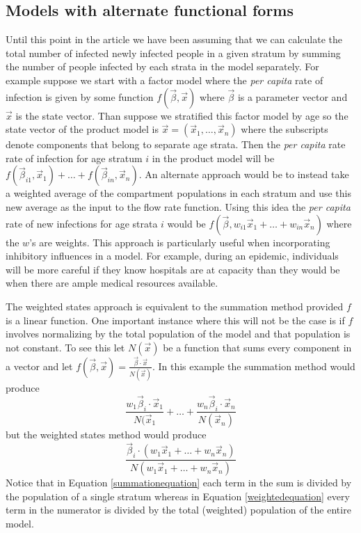 \documentclass[referee,sn-basic]{sn-jnl}%
\theoremstyle{definition}
\newcommand{\betavec}{\vec{\beta}}
\newcommand{\xvec}{\vec{x}}
\begin{document}
\subsection{Models with alternate functional forms}\label{aff}
Until this point in the article we have been assuming that we can calculate the total number of infected newly infected people in a given stratum by summing the number of people infected by each strata in the model separately. For example suppose we start with a factor model where the \emph{per capita} rate of infection is given by some function $f(\betavec, \xvec)$ where $\betavec$ is a parameter vector and $\xvec$ is the state vector. Than suppose we stratified this factor model by age so the state vector of the product model is $\xvec = (\xvec_1, \ldots, \xvec_n)$ where the subscripts denote components that belong to separate age strata. Then the \emph{per capita} rate rate of infection for age stratum $i$ in the product model will be $f(\betavec_{i1}, \xvec_1) + \ldots + f(\betavec_{in}, \xvec_n)$. An alternate approach would be to instead take a weighted average of the compartment populations in each stratum and use this new average as the input to the flow rate function. Using this idea the \emph{per capita} rate of new infections for age strata $i$ would be $f(\betavec, w_{i1}\xvec_1 + \ldots + w_{in}\xvec_n)$ where the $w$'s are weights. This approach is particularly useful when incorporating inhibitory influences in a model. For example, during an epidemic, individuals will be more careful if they know hospitals are at capacity than they would be when there are ample medical resources available. 

The weighted states approach is equivalent to the summation method provided $f$ is a linear function. One important instance where this will not be the case is if $f$ involves normalizing by the total population of the model and that population is not constant. To see this let $N(\xvec)$ be a function that sums every component in a vector and let $f(\betavec, \xvec) = \frac{\betavec \cdot \xvec}{N(\xvec)}$. In this example the summation method would produce 
\begin{equation}\label{summationequation}
\frac{w_1\betavec_{i}\cdot \xvec_1}{N(\xvec_1} + \ldots + \frac{w_n\betavec_{i}\cdot \xvec_n}{N(\xvec_n)}
\end{equation}\label{weightedequation}
but the weighted states method would produce
\begin{equation}
    \frac{\betavec_i \cdot (w_1\xvec_1+\ldots + w_n\xvec_n)}{N(w_1\xvec_1+\ldots + w_n\xvec_n)}
\end{equation}
Notice that in Equation \ref{summationequation} each term in the sum is divided by the population of a single stratum whereas in Equation \ref{weightedequation} every term in the numerator is divided by the total (weighted) population of the entire model. 
\end{document}
